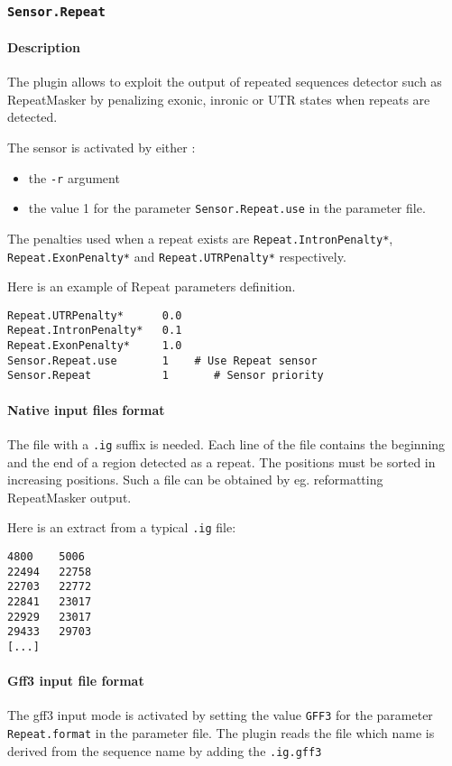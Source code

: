 
\subsubsection{\texttt{Sensor.Repeat}}

\paragraph{Description}

The plugin allows to exploit the output of repeated sequences detector
such as RepeatMasker by penalizing exonic, inronic or UTR states when
repeats are detected.

The sensor is activated by either :
\begin{itemize}
\item the \texttt{-r} argument 
\item the value 1 for the parameter \texttt{Sensor.Repeat.use} in the
  parameter file.
\end{itemize}
The penalties used when a repeat exists are \texttt{Repeat.IntronPenalty*},
\texttt{Repeat.ExonPenalty*} and \texttt{Repeat.UTRPenalty*}
respectively.

Here is an example of Repeat parameters definition.
\begin{Verbatim}[fontsize=\small]
Repeat.UTRPenalty*      0.0
Repeat.IntronPenalty*   0.1
Repeat.ExonPenalty*     1.0
Sensor.Repeat.use       1    # Use Repeat sensor
Sensor.Repeat           1       # Sensor priority
\end{Verbatim}

\paragraph{Native input files format}

The file with a \texttt{.ig} suffix is needed. Each line of the file
contains the beginning and the end of a region detected as a
repeat. The positions must be sorted in increasing positions. Such a
file can be obtained by eg. reformatting RepeatMasker output.

Here is an extract from a typical \texttt{.ig} file:
\begin{Verbatim}[fontsize=\small]
4800    5006
22494   22758
22703   22772
22841   23017
22929   23017
29433   29703
[...]
\end{Verbatim}

\paragraph{Gff3 input file format}
The gff3 input mode is activated by setting the value \texttt{GFF3} for the parameter
\texttt{Repeat.format} in the parameter file.
The plugin reads the file which name is derived from the sequence name by adding the \texttt{.ig.gff3}

